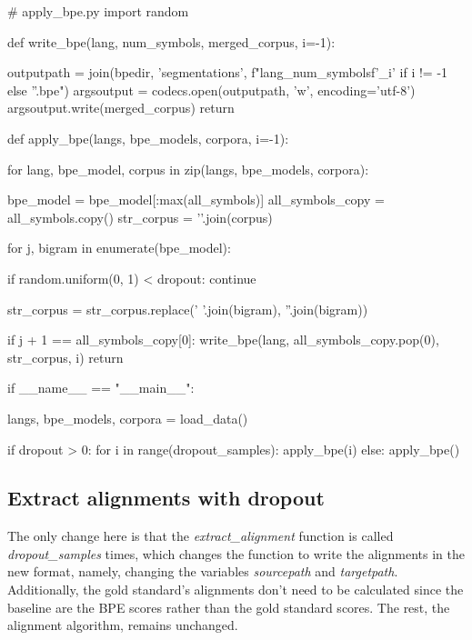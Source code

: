 \begin{python}
# apply_bpe.py
import random

def write_bpe(lang, num_symbols, merged_corpus, i=-1):

  outputpath = join(bpedir, 'segmentations', f"{lang}_{num_symbols}{f'_{i}' if i != -1 else ''}.bpe")
  argsoutput = codecs.open(outputpath, 'w', encoding='utf-8')
  argsoutput.write(merged_corpus)
  return

def apply_bpe(langs, bpe_models, corpora, i=-1):
    
  for lang, bpe_model, corpus in zip(langs, bpe_models, corpora):

    bpe_model = bpe_model[:max(all_symbols)]
    all_symbols_copy = all_symbols.copy()
    str_corpus = '\n'.join(corpus)

    for j, bigram in enumerate(bpe_model):

        if random.uniform(0, 1) < dropout:
            continue

      str_corpus = str_corpus.replace(' '.join(bigram), ''.join(bigram))

      if j + 1 == all_symbols_copy[0]:
        write_bpe(lang, all_symbols_copy.pop(0), str_corpus, i)
  return

if __name__ == "__main__":

  langs, bpe_models, corpora = load_data()

  if dropout > 0:
    for i in range(dropout_samples):
      apply_bpe(i)
  else:
      apply_bpe()
\end{python}

\subsection{Extract alignments with dropout}

The only change here is that the \emph{extract\_alignment} function is called \emph{dropout\_samples} times, which changes the function to write the alignments in the new format, namely, changing the variables \emph{sourcepath} and \emph{targetpath}. Additionally, the gold standard's alignments don't need to be calculated since the baseline are the BPE scores rather than the gold standard scores. The rest, the alignment algorithm, remains unchanged.

